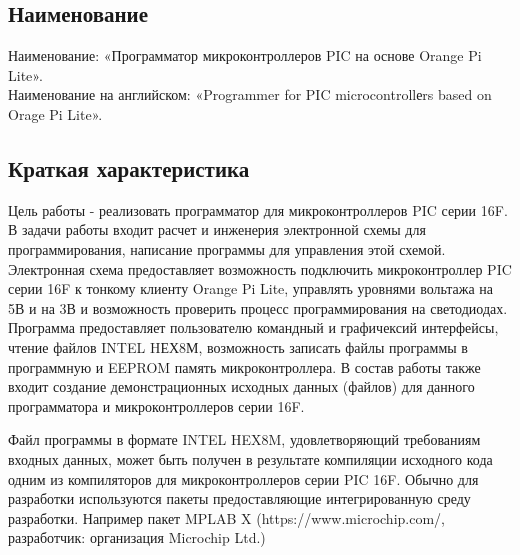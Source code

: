 \subsection{Наименование}
Наименование: «Программатор микроконтроллеров PIC на основе Orange Pi Lite». \\
Наименование на английском: «Programmer for PIC microcontrollеrs based on Orage Pi Lite». \\


\subsection{Краткая характеристика}
    Цель работы - реализовать программатор для микроконтроллеров PIC серии 16F.
    В задачи работы входит расчет и инженерия электронной схемы для программирования, написание программы для управления этой схемой.
    Электронная схема предоставляет возможность подключить микроконтроллер PIC серии 16F к тонкому клиенту Orange Pi Lite, управлять уровнями вольтажа на 5В и на 3В и возможность проверить процесс программирования на светодиодах.         
    Программа предоставляет пользователю командный и графичексий интерфейсы, чтение файлов INTEL HЕХ8М, возможность записать файлы программы в программную и EEPROM память микроконтроллера.
    В состав работы также входит создание демонстрационных исходных данных (файлов) для данного программатора и микроконтроллеров серии 16F.

\smallskip
Файл программы в формате INTEL HEX8M, удовлетворяющий требованиям входных данных, может быть получен в результате компиляции исходного кода одним из компиляторов для микроконтроллеров серии PIC 16F. Обычно для разработки используются пакеты предоставляющие интегрированную среду разработки. Например пакет MPLAB X (https://www.microchip.com/, разработчик: организация Microchip Ltd.)
